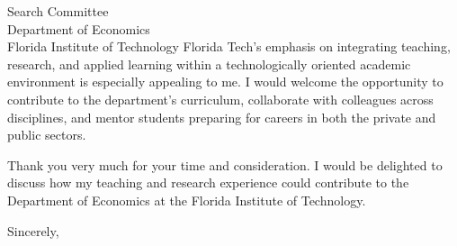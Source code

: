 \documentclass[11pt]{letter}
\begin{document}
\begin{letter}{Search Committee \\
Department of Economics \\
Florida Institute of Technology}
Florida Tech’s emphasis on integrating teaching, research, and applied learning within a technologically oriented academic environment is especially appealing to me. I would welcome the opportunity to contribute to the department’s curriculum, collaborate with colleagues across disciplines, and mentor students preparing for careers in both the private and public sectors.

Thank you very much for your time and consideration. I would be delighted to discuss how my teaching and research experience could contribute to the Department of Economics at the Florida Institute of Technology.

\closing{Sincerely,}

\end{letter}
\end{document}
